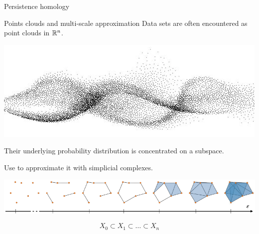 
\begin{frame}
	\centering
	\vspace*{2.6cm}
	\Huge {}
	\vskip 20pt
	\Large Persistence homology
\end{frame}

\begin{frame}{Points clouds and multi-scale approximation}
	\pause
	Data sets are often encountered as point clouds in $\mathbb{R}^n$.

	\pause
	\begin{center}
		\includegraphics[scale=.4]{aux/point_cloud_cropped}
	\end{center}

	\pause
	Their underlying probability distribution is concentrated on a subspace.

	\medskip\pause
	Use  to approximate it with simplicial complexes.
	\medskip
	\begin{center}
		\includegraphics[scale=.7]{aux/vietoris-rips}
	\end{center}

	\vskip-15pt
	\[
	X_{0} \subset X_{1} \subset\dots\subset X_{n}
	\]
\end{frame}

